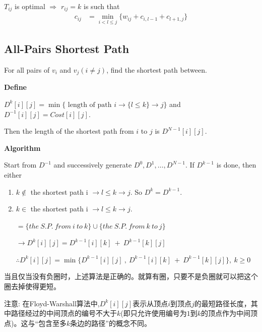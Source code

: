 \documentclass{article}
\begin{document}
$T_{ij}$ is optimal $\Rightarrow$ $r_{ij}=k$ is such that
\begin{align*}
    c_{ij}&=\min_{i<l\le j}\{ w_{ij}+c_{i, l-1}+c_{l+1,j} \}
\end{align*}

\subsection{All-Pairs Shortest Path}
For all pairs of $v_i$ and $v_j ( i \ne j )$, find the shortest path between.\par

\textbf{Define}\par
$D^k[i][j] = \min\{\text{ length of path }i \rightarrow \{ l \le k \} \rightarrow j \}$  and  $D^{-1}[i][j] = Cost[i][j]$.   \par
Then the length of the shortest path from $i$ to $j$  is $D^{N-1}[i][j]$. 

\hspace*{\fill}\par
\textbf{Algorithm}\par
Start from $D^{-1}$ and successively generate $D^0, D^1, \dots, D^{N-1}$. If $D^{k-1}$ is done, then either
\begin{enumerate}
    \item $k \notin $ the shortest path i $\rightarrow {l \le k} \rightarrow j$. So $D^k = D^{k-1}$.
    \item $k \in $ the shortest path i $\rightarrow {l \le k} \rightarrow j$.\par
    $ = \{the \ S.P. \ from\ i \ to \ k \} \cup \{the \ S.P. \ from \ k \ to \ j \}$\par
    $ \rightarrow D^k[i][j] = D^{k-1}[i][k] \ + \  D^{k-1}[k][j]$\par
    $ \therefore D^k[i][j]=\min\{ D^{k-1}[i][j]\ ,\ D^{k-1}[i][k] \ + \ D^{k-1}[k][j] \},\ k\ge 0$
\end{enumerate}

当且仅当没有负圈时，上述算法是正确的。就算有圈，只要不是负圈就可以把这个圈去掉使得更短。

\hspace*{\fill}\par

注意: 在Floyd-Warshall算法中,$D^k[i][j]$表示从顶点$i$到顶点$j$的最短路径长度，其中路径经过的中间顶点的编号不大于$k$(即只允许使用编号为$1$到$k$的顶点作为中间顶点)。这与“包含至多$k$条边的路径”的概念不同。
\end{document}
